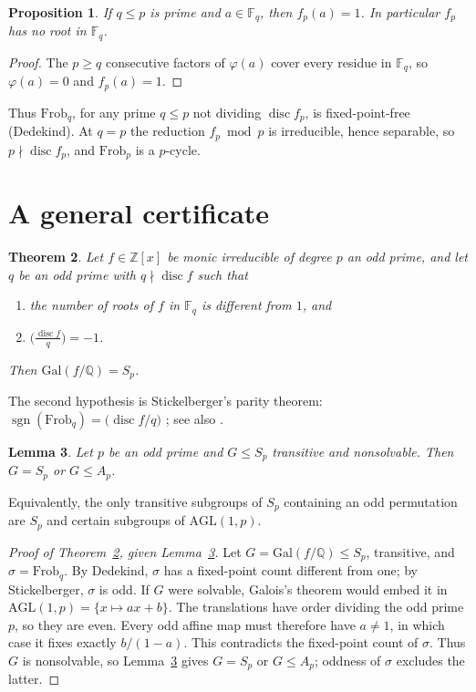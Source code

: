 \documentclass[11pt,a4paper]{amsart}
\newcommand{\AGL}{\mathrm{AGL}}
\newcommand{\F}{\mathbb{F}}
\newcommand{\Q}{\mathbb{Q}}
\newcommand{\Z}{\mathbb{Z}}
\newcommand{\Gal}{\mathrm{Gal}}
\newcommand{\disc}{\operatorname{disc}}
\newcommand{\sgn}{\operatorname{sgn}}
\newcommand{\Frob}{\mathrm{Frob}}
\theoremstyle{plain}
\newtheorem{theorem}{Theorem}
\newtheorem{lemma}[theorem]{Lemma}
\newtheorem{proposition}[theorem]{Proposition}
\theoremstyle{definition}
\begin{document}
\begin{proposition}
\label{prop:noroots}
If \(q\le p\) is prime and \(a\in\F_q\), then \(f_p(a)=1\). In particular \(f_p\) has no root in \(\F_q\).
\end{proposition}

\begin{proof}
The \(p\ge q\) consecutive factors of \(\varphi(a)\) cover every residue in \(\F_q\), so \(\varphi(a)=0\) and \(f_p(a)=1\).
\end{proof}

Thus \(\Frob_q\), for any prime \(q\le p\) not dividing \(\disc f_p\), is fixed-point-free (Dedekind). At \(q=p\) the reduction \(f_p\bmod p\) is irreducible, hence separable, so \(p\nmid\disc f_p\), and \(\Frob_p\) is a \(p\)-cycle.

\section{A general certificate}
\label{sec:cert}

\begin{theorem}
\label{thm:cert}
Let \(f\in\Z[x]\) be monic irreducible of degree \(p\) an odd prime, and let \(q\) be an odd prime with \(q\nmid\disc f\) such that
\begin{enumerate}
\item the number of roots of \(f\) in \(\F_q\) is different from \(1\), and
\item \(\bigl(\frac{\disc f}{q}\bigr)=-1\).
\end{enumerate}
Then \(\Gal(f/\Q)=S_p\).
\end{theorem}

The second hypothesis is Stickelberger's parity theorem: \(\sgn(\Frob_q)=\bigl(\disc f/q\bigr)\) \cite[p.~186]{Stickelberger1898}; see also \cite[Part~I, Thms.~1 and~3]{Dalawat}.

\begin{lemma}
\label{lem:contain}
Let \(p\) be an odd prime and \(G\le S_p\) transitive and nonsolvable. Then \(G=S_p\) or \(G\le A_p\).
\end{lemma}

Equivalently, the only transitive subgroups of \(S_p\) containing an odd permutation are \(S_p\) and certain subgroups of \(\AGL(1,p)\).

\begin{proof}[Proof of Theorem~\ref{thm:cert}, given Lemma~\ref{lem:contain}]
Let \(G=\Gal(f/\Q)\le S_p\), transitive, and \(\sigma=\Frob_q\). By Dedekind, \(\sigma\) has a fixed-point count different from one; by Stickelberger, \(\sigma\) is odd. If \(G\) were solvable, Galois's theorem \cite[\S2]{JonesZvonkin} would embed it in \(\AGL(1,p)=\{x\mapsto ax+b\}\). The translations have order dividing the odd prime \(p\), so they are even. Every odd affine map must therefore have \(a\ne1\), in which case it fixes exactly \(b/(1-a)\). This contradicts the fixed-point count of \(\sigma\). Thus \(G\) is nonsolvable, so Lemma~\ref{lem:contain} gives \(G=S_p\) or \(G\le A_p\); oddness of \(\sigma\) excludes the latter.
\end{proof}
\end{document}
